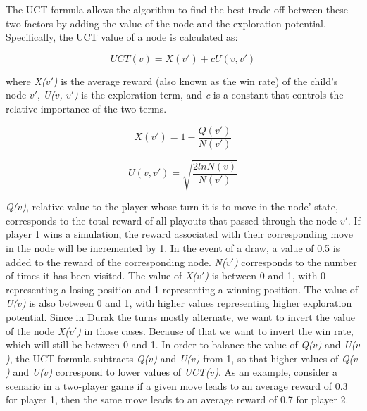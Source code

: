 The UCT formula allows the algorithm to find the best trade-off between these two factors by adding the value of the node and the exploration potential. Specifically, the UCT value of a node is calculated as:

\[ UCT(v) = X(v') + cU(v, v')\]

where \textit{X($v'$)} is the average reward (also known as the win rate) of the child's node $v'$, \textit{U($v$, $v'$)} is the exploration term, and \textit{c} is a constant that controls the relative importance of the two terms.

\[ X(v') = 1 - \frac{Q(v')}{N(v')}\]

\[ U(v, v') = \sqrt{\frac{2 ln{N(v)}}{N(v')}}  \]

\textit{Q($v$)}, relative value to the player whose turn it is to move in the node' state, corresponds to the total reward of all playouts that passed through the node $v'$. If player 1 wins a simulation, the reward associated with their corresponding move in the node will be incremented by 1. In the event of a draw, a value of 0.5 is added to the reward of the corresponding node. \textit{N($v'$)} corresponds to the number of times it has been visited. The value of \textit{X($v'$)} is between 0 and 1, with 0 representing a losing position and 1 representing a winning position. The value of \textit{U($v$)} is also between 0 and 1, with higher values representing higher exploration potential. Since in Durak the turns mostly alternate, we want to invert the value of the node \textit{X($v'$)} in those cases. Because of that we want to invert the win rate, which will still be between 0 and 1. In order to balance the value of \textit{Q($v$)} and \textit{U($v$)}, the UCT formula subtracts \textit{Q($v$)} and \textit{U($v$)} from 1, so that higher values of \textit{Q($v$)} and \textit{U($v$)} correspond to lower values of \textit{UCT($v$)}. As an example, consider a scenario in a two-player game if a given move leads to an average reward of 0.3 for player 1, then the same move leads to an average reward of 0.7 for player 2. 

